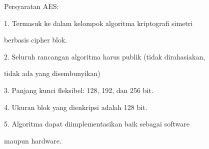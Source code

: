 \documentclass{article}
\begin{document}

Persyaratan AES:

1. Termasuk ke dalam kelompok algoritma kriptografi simetri 

berbasis cipher blok.

2. Seluruh rancangan algoritma harus publik (tidak dirahasiakan, 

tidak ada yang disembunyikan)

3. Panjang kunci fleksibel: 128, 192, dan 256 bit.

4. Ukuran blok yang dienkripsi adalah 128 bit.

5. Algoritma dapat diimplementasikan baik sebagai software 

maupun hardware.
\end{document}
